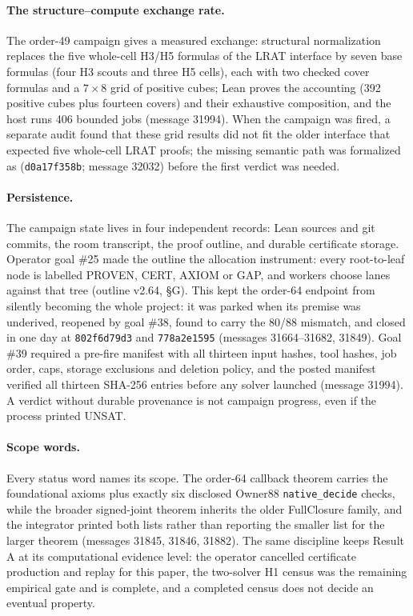 \documentclass{anvil-paper}
\theoremstyle{definition}
\begin{document}
\paragraph{The structure--compute exchange rate.} The order-49 campaign gives a measured exchange: structural normalization replaces the five whole-cell H3/H5 formulas of the LRAT interface by seven base formulas (four H3 scouts and three H5 cells), each with two checked cover formulas and a $7\times 8$ grid of positive cubes; Lean proves the accounting (392 positive cubes plus fourteen covers) and their exhaustive composition, and the host runs 406 bounded jobs (message 31994). When the campaign was fired, a separate audit found that these grid results did not fit the older interface that expected five whole-cell LRAT proofs; the missing semantic path was formalized as  (\texttt{d0a17f358b}; message 32032) before the first verdict was needed.

\paragraph{Persistence.} The campaign state lives in four independent records: Lean sources and git commits, the room transcript, the proof outline, and durable certificate storage. Operator goal \#25 made the outline the allocation instrument: every root-to-leaf node is labelled PROVEN, CERT, AXIOM or GAP, and workers choose lanes against that tree (outline v2.64, \S G). This kept the order-64 endpoint from silently becoming the whole project: it was parked when its premise was underived, reopened by goal \#38, found to carry the 80/88 mismatch, and closed in one day at \texttt{802f6d79d3} and \texttt{778a2e1595} (messages 31664--31682, 31849). Goal \#39 required a pre-fire manifest with all thirteen input hashes, tool hashes, job order, caps, storage exclusions and deletion policy, and the posted manifest verified all thirteen SHA-256 entries before any solver launched (message 31994). A verdict without durable provenance is not campaign progress, even if the process printed UNSAT.

\paragraph{Scope words.} Every status word names its scope. The order-64 callback theorem carries the foundational axioms plus exactly six disclosed Owner88 \texttt{native\_decide} checks, while the broader signed-joint theorem inherits the older FullClosure family, and the integrator printed both lists rather than reporting the smaller list for the larger theorem (messages 31845, 31846, 31882). The same discipline keeps Result A at its computational evidence level: the operator cancelled certificate production and replay for this paper, the two-solver H1 census was the remaining empirical gate and is complete, and a completed census does not decide an eventual property.
\end{document}
